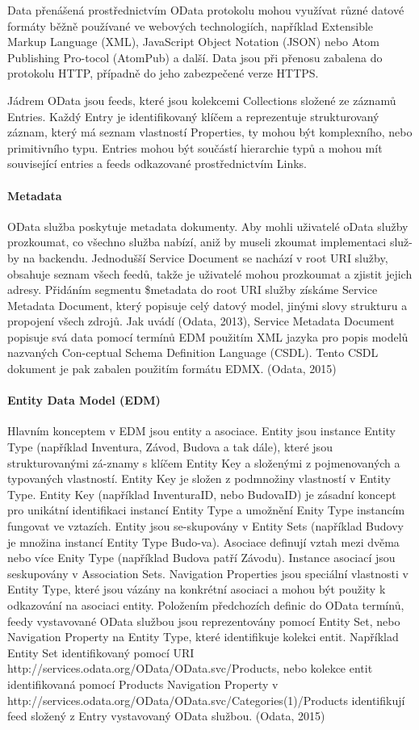 \documentclass[thesis=M,czech]{FITthesis}[2012/06/26]
\begin{document}
Data přenášená prostřednictvím OData protokolu mohou využívat různé datové formáty běžně používané ve webových technologiích, například Extensible Markup Language (XML), JavaScript Object Notation (JSON) nebo Atom Publishing Pro-tocol (AtomPub) a další. Data jsou při přenosu zabalena do protokolu HTTP, případně do jeho zabezpečené verze HTTPS.

Jádrem OData jsou feeds, které jsou kolekcemi Collections složené ze záznamů Entries. Každý Entry je identifikovaný klíčem a reprezentuje strukturovaný záznam, který má seznam vlastností Properties, ty mohou být komplexního, nebo primitivního typu. Entries mohou být součástí hierarchie typů a mohou mít související entries a feeds odkazované prostřednictvím Links.

\paragraph{Metadata} OData služba poskytuje metadata dokumenty. Aby mohli uživatelé oData služby prozkoumat, co všechno služba nabízí, aniž by museli zkoumat implementaci služ-by na backendu.
Jednodušší Service Document se nachází v root URI služby, obsahuje seznam všech feedů, takže je uživatelé mohou prozkoumat a zjistit jejich adresy.
Přidáním segmentu \$metadata do root URI služby získáme Service Metadata Document, který popisuje celý datový model, jinými slovy strukturu a propojení všech zdrojů. Jak uvádí (Odata, 2013), Service Metadata Document popisuje svá data pomocí termínů EDM použitím XML jazyka pro popis modelů nazvaných Con-ceptual Schema Definition Language (CSDL). Tento CSDL dokument je pak zabalen použitím formátu EDMX. (Odata, 2015)

\paragraph{Entity Data Model (EDM)} Hlavním konceptem v EDM jsou entity a asociace. Entity jsou instance Entity Type (například Inventura, Závod, Budova a tak dále), které jsou strukturovanými zá-znamy s klíčem Entity Key a složenými z pojmenovaných a typovaných vlastností. Entity Key je složen z podmnožiny vlastností v Entity Type. Entity Key (například InventuraID, nebo BudovaID) je zásadní koncept pro unikátní identifikaci instancí Entity Type a umožnění Enity Type instancím fungovat ve vztazích. Entity jsou se-skupovány v Entity Sets (například Budovy je množina instancí Entity Type Budo-va).
Asociace definují vztah mezi dvěma nebo více Enity Type (například Budova patří Závodu). Instance asociací jsou seskupovány v Association Sets. Navigation Properties jsou speciální vlastnosti v Entity Type, které jsou vázány na konkrétní asociaci a mohou být použity k odkazování na asociaci entity.
Položením předchozích definic do OData termínů, feedy vystavované OData službou jsou reprezentovány pomocí Entity Set, nebo Navigation Property na Entity Type, které identifikuje kolekci entit. Například Entity Set identifikovaný pomocí URI http://services.odata.org/OData/OData.svc/Products, nebo kolekce entit identifikovaná pomocí Products Navigation Property v http://services.odata.org/OData/OData.svc/Categories(1)/Products identifikují feed složený z Entry vystavovaný OData službou. (Odata, 2015)
\end{document}
